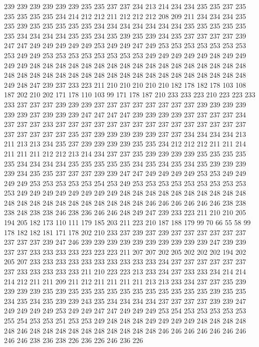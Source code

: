 239 239 239 239 239 239 235 235 237 237 234 213 214 234 234 235 235 237 235 235
235 235 235 234 214 212 212 211 212 212 212 208 209 211 234 234 234 235 235 239
235 235 235 235 235 234 234 234 234 234 234 234 235 235 235 235 235 235 234 234
234 234 235 235 234 235 239 235 239 234 235 237 237 237 237 239 247 247 249 249
249 249 249 253 249 249 247 249 253 253 253 253 253 253 253 253 249 249 253 253
253 253 253 253 253 253 249 249 249 249 249 248 249 249 249 249 248 248 248 248
248 248 248 248 248 248 248 248 248 248 248 248 248 248 248 248 248 248 248 248
248 248 248 248 248 248 248 248 248 248 248 248 249 248 247 239 237 233 223 211
210 210 210 210 210 182 178 182 178 103 108 187 202 210 202 171 178 110 103 99
171 178 187 210 233 233 223 210 223 223 233 233 237 237 237 239 239 239 237 237
237 237 237 237 237 237 239 239 239 239 239 239 237 239 239 239 247 247 247 247
239 239 239 239 237 237 237 237 234 237 237 237 233 237 237 237 237 237 237 237
237 237 237 237 237 237 237 237 237 237 237 237 237 235 237 239 239 239 239 239
237 237 234 234 234 234 213 211 213 213 234 235 237 239 239 239 239 235 235 234
212 212 212 211 211 214 211 211 211 212 212 213 214 234 237 237 235 239 239 239
239 235 235 235 235 235 234 234 234 234 235 235 235 235 235 234 235 234 235 234
235 239 239 239 239 234 235 235 237 237 237 239 239 247 247 249 249 249 249 253
253 249 249 249 249 253 253 253 253 253 254 253 249 253 253 253 253 253 253 253
253 253 253 249 249 249 249 249 249 249 249 248 248 248 248 248 248 248 248 248
248 248 248 248 248 248 248 248 248 248 248 248 246 246 246 246 246 246 238 238
238 248 238 238 246 238 236 246 246 248 249 247 239 233 223 211 210 210 205 194
205 182 173 110 111 179 185 203 211 223 210 187 188 179 99 70 66 55 58 99
178 182 182 181 171 178 202 210 233 237 239 237 239 237 237 237 237 237 237 237
237 237 239 247 246 239 239 239 239 239 239 239 239 239 239 247 239 239 237 237
233 233 233 233 223 223 223 211 207 207 202 205 202 202 202 194 202 205 207 233
233 233 233 233 233 233 233 233 233 234 237 237 237 237 237 237 237 233 233 233
233 233 211 210 223 223 213 233 234 237 233 233 234 214 214 214 212 211 211 209
211 212 211 211 211 211 213 213 233 234 237 237 235 239 239 239 239 235 239 235
235 235 235 235 235 235 235 235 235 235 239 235 235 234 235 234 235 239 239 243
235 234 234 234 234 237 237 237 237 239 239 247 249 249 249 249 253 249 249 247
247 249 249 249 253 254 253 253 253 253 253 255 254 253 253 251 253 253 249 248
248 248 249 249 249 249 248 248 248 248 248 246 248 248 248 248 248 248 248 248
248 248 246 246 246 246 246 246 246 246 246 238 236 238 226 236 226 246 236 226

